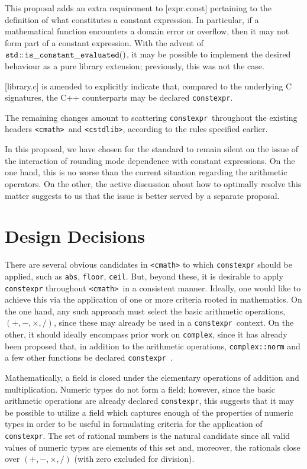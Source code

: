 \documentclass[prd,twocolumn,amsmath,amssymb,nofootinbib,eqsecnum]{revtex4-1}
\newcommand{\constexpr}{\code{constexpr}\xspace}
\newcommand{\code}[1]{{\tt #1}}
\newcommand{\header}[1]{{\tt <#1>}}
\newcommand{\cmath}{\header{cmath}}
\begin{document}
This proposal adds an extra requirement to [expr.const] pertaining to the definition of what constitutes a constant expression. In particular, if a mathematical function encounters a domain error or overflow, then it may not form part of a constant expression. With the advent of $\code{std\!::\!is\_constant\_evaluated()}$, \cite{ConstEval} it may be possible to implement the desired behaviour as a pure library extension; previously, this was not the case.

[library.c] is amended to explicitly indicate that, compared to the underlying C signatures, the C++ counterparts may be declared \constexpr. 

The remaining changes amount to scattering \constexpr\ throughout the existing headers \cmath\ and \header{cstdlib}, according to the rules specified earlier. 

In this proposal, we have chosen for the standard to remain silent on the issue of the interaction of rounding mode dependence with constant expressions. On the one hand, this is no worse than the current situation regarding the arithmetic operators. On the other, the active discussion about how to optimally resolve this matter suggests to us that the issue is better served by a separate proposal.

\section{Design Decisions}
\label{sec:dd}

There are several obvious candidates in \header{cmath} to which \constexpr should be applied, such as \code{abs}, \code{floor}, \code{ceil}.  But, beyond these, it is desirable to
apply \constexpr throughout \cmath\ in a consistent manner. Ideally, one would like to achieve this via the application of one or more criteria rooted in mathematics. On the one hand, any such approach must
select the
basic arithmetic operations, $(+,-,\times,/)$, since these may already be used in a 
\constexpr\ context. On the other,  it should ideally encompass prior work on \code{complex}, since it has already been proposed that, in addition to the arithmetic operations, \code{complex::norm} and a few other functions be declared \constexpr~\cite{AP-complex}. 

Mathematically, a field is closed under the elementary operations of addition
and multiplication.
Numeric types do not form a field; however, since the basic arithmetic
operations are already declared \constexpr, this suggests that it may be
possible to utilize a field which captures enough of the properties of numeric
types in order to be useful in formulating criteria for the application of
\constexpr. The set of rational numbers is the natural candidate since all valid
values of numeric types are elements of this set and, moreover, the rationals close over
$(+,-,\times,/)$ (with zero excluded for division).
\end{document}

